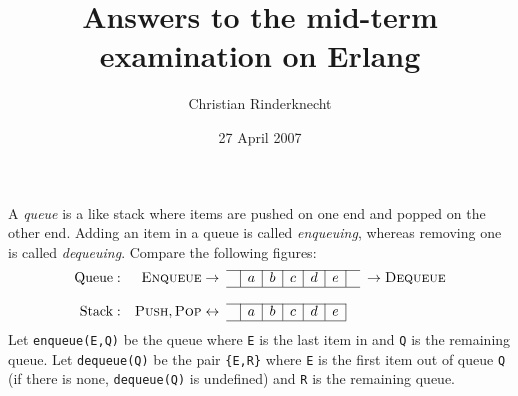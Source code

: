 \documentclass[11pt, a4paper]{article}
\title{Answers to the mid-term examination on Erlang}
\author{Christian Rinderknecht}
\date{27 April 2007}
\begin{document}
\maketitle

\thispagestyle{empty}

\noindent A \emph{queue} is a like stack where items are pushed on one
end and popped on the other end. Adding an item in a queue is called
\emph{enqueuing}, whereas removing one is called
\emph{dequeuing}. Compare the following figures:
\[
\begin{array}{rr@{\;}cc|c|c|c|c|c|cc@{\;}l}
\cline{4-10}
\text{Queue}: & \textsc{Enqueue} & \rightarrow & & a & b & c & d & e &
& \rightarrow & \textsc{Dequeue}\\
\cline{4-10}\\
\cline{4-9}
\text{Stack}: & \textsc{Push}, \textsc{Pop} & \leftrightarrow & & a &
b & c & d & e &&&\\
\cline{4-9}
\end{array}
\]
\noindent Let \texttt{enqueue(E,Q)} be the queue where \texttt{E} is
the last item in and \texttt{Q} is the remaining queue. Let
\texttt{dequeue(Q)} be the pair \texttt{\{E,R\}} where \texttt{E} is
the first item out of queue \texttt{Q} (if there is none,
\texttt{dequeue(Q)} is undefined) and \texttt{R} is the remaining
queue.

\bigskip






\end{document}
